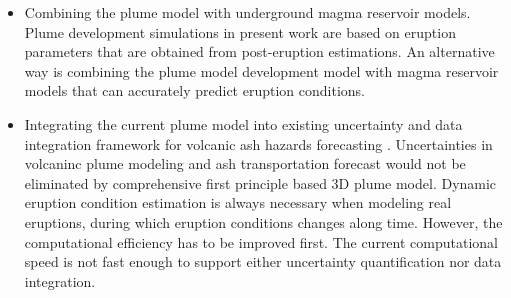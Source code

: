 \begin{itemize}
\item {Combining the plume model with underground magma reservoir models. Plume development simulations in present work are based on eruption parameters that are obtained from post-eruption estimations. An alternative way is combining the plume model development model with magma reservoir models that can accurately predict eruption conditions.}
\item {Integrating the current plume model into existing uncertainty and data integration framework for volcanic ash hazards forecasting \citep{patra2013challenges, madankan2014computation, stefanescu2014temporal}. Uncertainties in volcaninc plume modeling and ash transportation forecast would not be eliminated by comprehensive first principle based 3D plume model. Dynamic eruption condition estimation is always necessary when modeling real eruptions, during which eruption conditions changes along time. However, the computational efficiency has to be improved first. The current computational speed is not fast enough to support either uncertainty quantification nor data integration.}
\end{itemize}